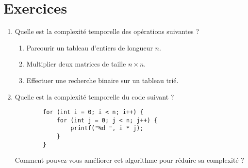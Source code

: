 \section{Exercices}

\begin{enumerate}
	\item Quelle est la complexité temporelle des opérations suivantes ?
	\begin{enumerate}
		\item Parcourir un tableau d'entiers de longueur $n$.
		\item Multiplier deux matrices de taille $n \times n$.
		\item Effectuer une recherche binaire sur un tableau trié.
	\end{enumerate}
	
	\item Quelle est la complexité temporelle du code suivant ?
	\begin{lstlisting}
		for (int i = 0; i < n; i++) {
			for (int j = 0; j < n; j++) {
				printf("%d ", i * j);
			}
		}
	\end{lstlisting}
	
	Comment pouvez-vous améliorer cet algorithme pour réduire sa complexité ?
	

\end{enumerate}
